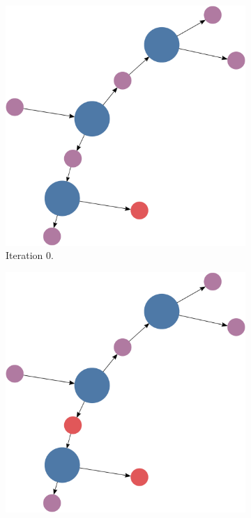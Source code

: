 \documentclass[titlepage,11pt]{article}
\begin{document}
\begin{figure}[!htb]
	\centering
	\begin{subfigure}[!htb]{0.19\textwidth}
		\centering
		\includegraphics[width=\columnwidth]{figures/knn_simple_lambda_think_0.pdf}
		\caption{Iteration 0.}
	\end{subfigure}
	\begin{subfigure}[!htb]{0.19\textwidth}
		\centering
		\includegraphics[width=\columnwidth]{figures/knn_simple_lambda_think_1.pdf}

\end{subfigure}
\end{figure}
\end{document}
